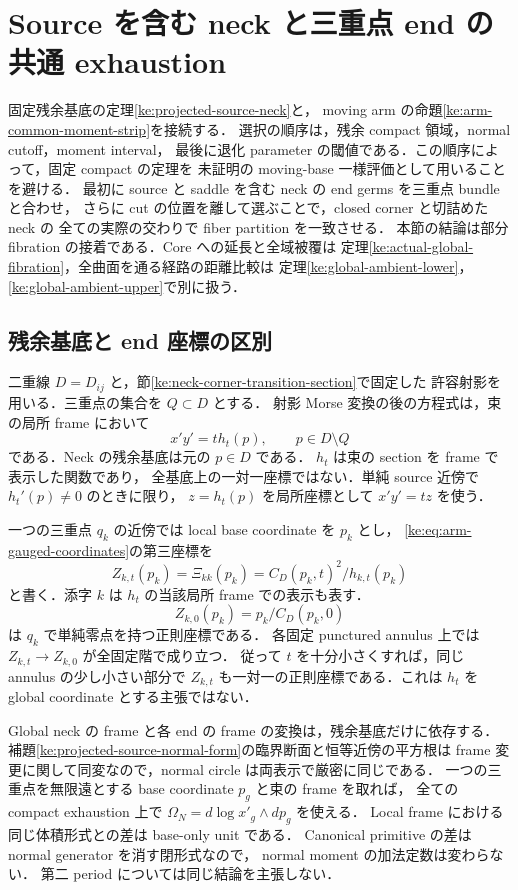 \section{Source を含む neck と三重点 end の共通 exhaustion}
\label{ke:neck-corner-exhaustion-section}

固定残余基底の定理\ref{ke:projected-source-neck}と，
moving arm の命題\ref{ke:arm-common-moment-strip}を接続する．
選択の順序は，残余 compact 領域，normal cutoff，moment interval，
最後に退化 parameter の閾値である．この順序によって，固定 compact の定理を
未証明の moving-base 一様評価として用いることを避ける．
最初に source と saddle を含む neck の end germs を三重点 bundle と合わせ，
さらに cut の位置を離して選ぶことで，closed corner と切詰めた neck の
全ての実際の交わりで fiber partition を一致させる．
本節の結論は部分 fibration の接着である．Core への延長と全域被覆は
定理\ref{ke:actual-global-fibration}，全曲面を通る経路の距離比較は
定理\ref{ke:global-ambient-lower}，\ref{ke:global-ambient-upper}で別に扱う．

\subsection{残余基底と end 座標の区別}

二重線 $D=D_{ij}$ と，節\ref{ke:neck-corner-transition-section}で固定した
許容射影を用いる．三重点の集合を $Q\subset D$ とする．
射影 Morse 変換の後の方程式は，束の局所 frame において
\[
 x'y'=t h_t(p),\qquad p\in D\setminus Q
\]
である．Neck の残余基底は元の $p\in D$ である．
$h_t$ は束の section を frame で表示した関数であり，
全基底上の一対一座標ではない．単純 source 近傍で $h_t'(p)\ne0$ のときに限り，
$z=h_t(p)$ を局所座標として $x'y'=tz$ を使う．

一つの三重点 $q_k$ の近傍では local base coordinate を $p_k$ とし，
\eqref{ke:eq:arm-gauged-coordinates}の第三座標を
\[
 Z_{k,t}(p_k)=\Xi_{kk}(p_k)=C_D(p_k,t)^2/h_{k,t}(p_k)
\]
と書く．添字 $k$ は $h_t$ の当該局所 frame での表示も表す．
\[
 Z_{k,0}(p_k)=p_k/C_D(p_k,0)
\]
は $q_k$ で単純零点を持つ正則座標である．
各固定 punctured annulus 上では $Z_{k,t}\to Z_{k,0}$ が全固定階で成り立つ．
従って $t$ を十分小さくすれば，同じ annulus の少し小さい部分で
$Z_{k,t}$ も一対一の正則座標である．これは $h_t$ を global coordinate とする主張ではない．

Global neck の frame と各 end の frame の変換は，残余基底だけに依存する．
補題\ref{ke:projected-source-normal-form}の臨界断面と恒等近傍の平方根は
frame 変更に関して同変なので，normal circle は両表示で厳密に同じである．
一つの三重点を無限遠とする base coordinate $p_g$ と束の frame を取れば，
全ての compact exhaustion 上で $\Omega_N=d\log x'_g\wedge dp_g$ を使える．
Local frame における同じ体積形式との差は base-only unit である．
Canonical primitive の差は normal generator を消す閉形式なので，
normal moment の加法定数は変わらない．
第二 period については同じ結論を主張しない．

